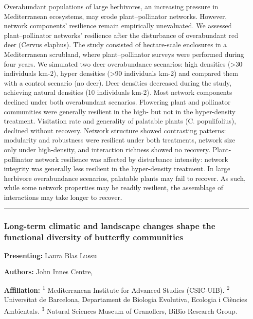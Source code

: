 \documentclass[
  letterpaper,
  DIV=11,
  numbers=noendperiod]{scrartcl}
\begin{document}
Overabundant populations of large herbivores, an increasing pressure in
Mediterranean ecosystems, may erode plant--pollinator networks. However,
network components' resilience remain empirically unevaluated. We
assessed plant--pollinator networks' resilience after the disturbance of
overabundant red deer (Cervus elaphus). The study consisted of
hectare-scale enclosures in a Mediterranean scrubland, where
plant--pollinator surveys were performed during four years. We simulated
two deer overabundance scenarios: high densities (\textgreater30
individuals km-2), hyper densities (\textgreater90 individuals km-2) and
compared them with a control scenario (no deer). Deer densities
decreased during the study, achieving natural densities (10 individuals
km-2). Most network components declined under both overabundant
scenarios. Flowering plant and pollinator communities were generally
resilient in the high- but not in the hyper-density treatment.
Visitation rate and generality of palatable plants (C. populifolius),
declined without recovery. Network structure showed contrasting
patterns: modularity and robustness were resilient under both
treatments, network size only under high-density, and interaction
richness showed no recovery. Plant-pollinator network resilience was
affected by disturbance intensity: network integrity was generally less
resilient in the hyper-density treatment. In large herbivore
overabundance scenarios, palatable plants may fail to recover. As such,
while some network properties may be readily resilient, the assemblage
of interactions may take longer to recover.

\begin{center}\rule{0.5\linewidth}{0.5pt}\end{center}

\subsubsection{Long-term climatic and landscape changes shape the
functional diversity of butterfly
communities}\label{long-term-climatic-and-landscape-changes-shape-the-functional-diversity-of-butterfly-communities}

\textbf{Presenting:} Laura Blas Lussu

\textbf{Authors:} John Innes Centre,

\textbf{Affiliation:} \textsuperscript{1} Mediterranean Institute for
Advanced Studies (CSIC-UIB). \textsuperscript{2} Universitat de
Barcelona, Departament de Biologia Evolutiva, Ecologia i Ciències
Ambientals. \textsuperscript{3} Natural Sciences Museum of Granollers,
BiBio Research Group.
\end{document}
